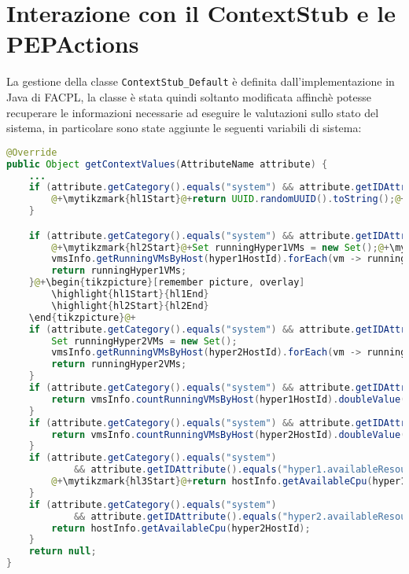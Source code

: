 \section{Interazione con il ContextStub e le PEPActions}
La gestione della classe \texttt{ContextStub\_Default} è definita dall'implementazione in Java di FACPL, la classe è stata quindi soltanto modificata affinchè potesse recuperare le informazioni necessarie ad eseguire le valutazioni sullo stato del sistema, in particolare sono state aggiunte le seguenti variabili di sistema:
\begin{lstlisting}[language=Java, caption=Context di OpenNebula, label=code:ContextStubChoice, basicstyle=\fontsize{9}{10}\ttfamily]
@Override
public Object getContextValues(AttributeName attribute) {
    ...
    if (attribute.getCategory().equals("system") && attribute.getIDAttribute().equals("vm-name")) {
        @+\mytikzmark{hl1Start}@+return UUID.randomUUID().toString();@+\mytikzmark{hl1End}@+
    }

    if (attribute.getCategory().equals("system") && attribute.getIDAttribute().equals("hyper1.vm-names")) {
        @+\mytikzmark{hl2Start}@+Set runningHyper1VMs = new Set();@+\mytikzmark{hl2End}@+
        vmsInfo.getRunningVMsByHost(hyper1HostId).forEach(vm -> runningHyper1VMs.addValue(vm.getVmName()));
        return runningHyper1VMs;
    }@+\begin{tikzpicture}[remember picture, overlay]
        \highlight{hl1Start}{hl1End}
        \highlight{hl2Start}{hl2End}
    \end{tikzpicture}@+
    if (attribute.getCategory().equals("system") && attribute.getIDAttribute().equals("hyper2.vm-names")) {
        Set runningHyper2VMs = new Set();
        vmsInfo.getRunningVMsByHost(hyper2HostId).forEach(vm -> runningHyper2VMs.addValue(vm.getVmName()));
        return runningHyper2VMs;
    }
    if (attribute.getCategory().equals("system") && attribute.getIDAttribute().equals("hyper1.vm1-counter")) {
        return vmsInfo.countRunningVMsByHost(hyper1HostId).doubleValue();
    }
    if (attribute.getCategory().equals("system") && attribute.getIDAttribute().equals("hyper2.vm1-counter")) {
        return vmsInfo.countRunningVMsByHost(hyper2HostId).doubleValue();
    }
    if (attribute.getCategory().equals("system")
            && attribute.getIDAttribute().equals("hyper1.availableResources")) {
        @+\mytikzmark{hl3Start}@+return hostInfo.getAvailableCpu(hyper1HostId);@+\mytikzmark{hl3End}@+
    }
    if (attribute.getCategory().equals("system")
            && attribute.getIDAttribute().equals("hyper2.availableResources")) {
        return hostInfo.getAvailableCpu(hyper2HostId);
    }
    return null;
}
\end{lstlisting}
